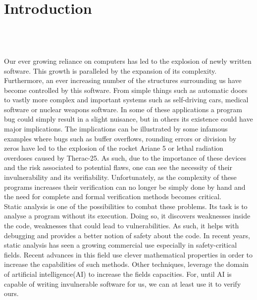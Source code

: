
\setcounter{chapter}{0}

\chapter{Introduction}
\mbox{}\\
\mbox{}\\
\mbox{}\\
Our ever growing reliance on computers has led to the explosion of newly written software. This growth is paralleled by the expansion of its complexity. Furthermore, an ever increasing number of the structures surrounding us have become controlled by this software. From simple things such as automatic doors to vastly more complex and important systems such as self-driving cars, medical software or nuclear weapons software. In some of these applications a program bug could simply result in a slight nuisance, but in others its existence could have major implications. The implications can be illustrated by some infamous examples where bugs such as buffer overflows, rounding errors or division by zeros have led to the explosion of the rocket Ariane 5 or lethal radiation overdoses caused by Therac-25. As such, due to the importance of these devices and the risk associated to potential flaws, one can see the necessity of their invulnerability and its verifiability. Unfortunately, as the complexity of these programs increases their verification can no longer be simply done by hand and the need for complete and formal verification methods becomes critical.\\
Static analysis is one of the possibilities to combat these problems. Its task is to analyse a program without its execution. Doing so, it discovers weaknesses inside the code, weaknesses that could lead to vulnerabilities. As such, it helps with debugging and provides a better notion of safety about the code. In recent years, static analysis has seen a growing commercial use especially in safety-critical fields. Recent advances in this field use clever mathematical properties in order to increase the capabilities of such methods. Other techniques, leverage the domain of artificial intelligence(AI) to increase the fields capacities. For, until AI is capable of writing invulnerable software for us, we can at least use it to verify ours.

